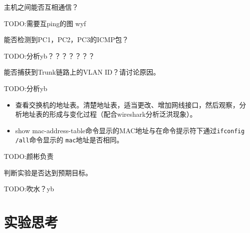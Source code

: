 \documentclass{myreport}
\begin{document}
\begin{tcolorbox}[title = {观察一}]
主机之间能否互相通信？
\end{tcolorbox}
TODO:需要互ping的图
wyf
\begin{tcolorbox}[title = {观察二}]
    能否检测到PC1，PC2，PC3的ICMP包？
\end{tcolorbox}
TODO:分析yb？？？？？？？

\begin{tcolorbox}[title = {观察三}]
能否捕获到Trunk链路上的VLAN ID？请讨论原因。
\end{tcolorbox}
TODO:分析yb

\begin{tcolorbox}[title = {观察四}]
    
    \begin{itemize}
        \item 查看交换机的地址表。清楚地址表，适当更改、增加网线接口，然后观察，分析地址表的形成与变化过程（配合wireshark分析泛洪现象）。
        \item show mac-address-table命令显示的MAC地址与在命令提示符下通过\texttt{ifconfig /all}命令显示的 \texttt{mac}地址是否相同。
    \end{itemize}
    
\end{tcolorbox}
TODO:颜彬负责

\begin{tcolorbox}[title = {观察五}]
判断实验是否达到预期目标。
\end{tcolorbox}

TODO:吹水？yb

\section{实验思考}
\end{document}
